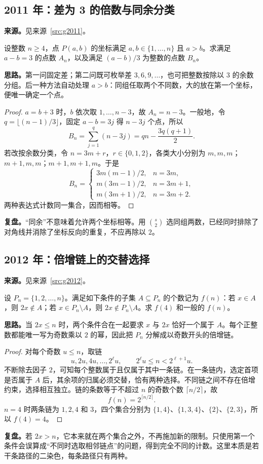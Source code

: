 \documentclass[UTF8,12pt,a4paper,fontset=fandol]{ctexart}
\begin{document}
\subsection{2011 年：差为 3 的倍数与同余分类}\label{sec:g2011}
\textbf{来源。}见来源~\ref{src:g2011}。
\begin{example}[题意重述]
设整数 $n\geq4$，点 $P(a,b)$ 的坐标满足 $a,b\in\{1,\ldots,n\}$ 且 $a>b$。求满足 $a-b=3$ 的点数 $A_n$，以及满足 $(a-b)/3$ 为整数的点数 $B_n$。
\end{example}
\textbf{思路。}第一问固定差；第二问既可枚举差 $3,6,9,\ldots$，也可把整数按除以 $3$ 的余数分组。后一种方法自动处理 $a>b$：同组任取两个不同数，大的放在第一个坐标，便唯一确定一个点。
\begin{proof}
$a=b+3$ 时，$b$ 依次取 $1,\ldots,n-3$，故 $A_n=n-3$。一般地，令 $q=\lfloor(n-1)/3\rfloor$，固定 $a-b=3j$ 得 $n-3j$ 个点，所以
\[
B_n=\sum_{j=1}^{q}(n-3j)=qn-\frac{3q(q+1)}2.
\]
若改按余数分类，令 $n=3m+r$，$r\in\{0,1,2\}$，各类大小分别为 $m,m,m$；$m+1,m,m$；$m+1,m+1,m$。于是
\[
B_n=\begin{cases}
3m(m-1)/2,&n=3m,\\
m(3m-1)/2,&n=3m+1,\\
m(3m+1)/2,&n=3m+2.
\end{cases}
\]
两种表达式计数同一集合，因而相等。
\end{proof}
\textbf{复盘。}“同余”不意味着允许两个坐标相等。用 $\binom{s}{2}$ 选同组两数，已经同时排除了对角线并消除了坐标反向的重复，不应再除以 $2$。

\subsection{2012 年：倍增链上的交替选择}\label{sec:g2012}
\textbf{来源。}见来源~\ref{src:g2012}。
\begin{example}[题意重述]
设 $P_n=\{1,2,\ldots,n\}$。满足如下条件的子集 $A\subseteq P_n$ 的个数记为 $f(n)$：若 $x\in A$，则 $2x\notin A$；若 $x\in P_n\setminus A$，则 $2x\notin P_n\setminus A$。求 $f(4)$ 和一般的 $f(n)$。
\end{example}
\textbf{思路。}当 $2x\leq n$ 时，两个条件合在一起要求 $x$ 与 $2x$ 恰好一个属于 $A$。每个正整数都能唯一写为奇数乘以 $2$ 的幂，因此把 $P_n$ 分解成以奇数开头的倍增链。
\begin{proof}
对每个奇数 $u\leq n$，取链
\[
u,2u,4u,\ldots,2^{\ell}u,
\qquad 2^{\ell}u\leq n<2^{\ell+1}u.
\]
不断除去因子 $2$，可知每个整数属于且仅属于其中一条链。在一条链内，选定首项是否属于 $A$ 后，其余项的归属必须交替，恰有两种选择。不同链之间不存在倍增约束，选择相互独立。链的条数等于不超过 $n$ 的奇数个数 $\lceil n/2\rceil$，故
\[
\boxed{f(n)=2^{\lceil n/2\rceil}}.
\]
$n=4$ 时两条链为 $1,2,4$ 和 $3$，四个集合分别为 $\{1,4\}$、$\{1,3,4\}$、$\{2\}$、$\{2,3\}$，所以 $f(4)=4$。
\end{proof}
\textbf{复盘。}若 $2x>n$，它本来就在两个集合之外，不再施加新的限制。只使用第一个条件会误算成“不同时选取相邻链点”的问题，得到完全不同的计数。这里本质是若干条路径的二染色，每条路径只有两种。
\end{document}
